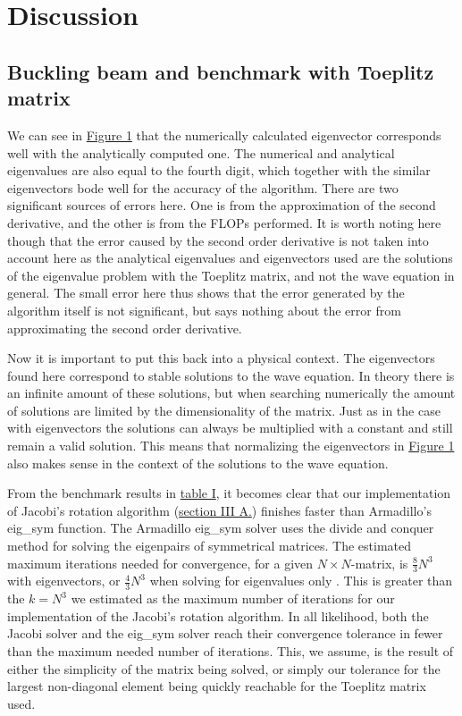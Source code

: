 \documentclass[reprint,english,notitlepage]{revtex4-1}  %
\begin{document}
\newpage

\section{Discussion} \label{sec:V}

\subsection{Buckling beam and benchmark with Toeplitz matrix} \label{sec:V:a}

We can see in \hyperref[fig:IV:a:1]{Figure 1} that the numerically calculated eigenvector corresponds well with the analytically computed one. The numerical and analytical eigenvalues are also equal to the fourth digit, which together with the similar eigenvectors bode well for the accuracy of the algorithm. There are two significant sources of errors here. One is from the approximation of the second derivative, and the other is from the FLOPs performed. It is worth noting here though that the error caused by the second order derivative is not taken into account here as the analytical eigenvalues and eigenvectors used are the solutions of the eigenvalue problem with the Toeplitz matrix, and not the wave equation in general. The small error here thus shows that the error generated by the algorithm itself is not significant, but says nothing about the error from approximating the second order derivative.

Now it is important to put this back into a physical context. The eigenvectors found here correspond to stable solutions to the wave equation. In theory there is an infinite amount of these solutions, but when searching numerically the amount of solutions are limited by the dimensionality of the matrix. Just as in the case with eigenvectors the solutions can always be multiplied with a constant and still remain a valid solution. This means that normalizing the eigenvectors in \hyperref[fig:IV:a:1]{Figure 1} also makes sense in the context of the solutions to the wave equation.

From the benchmark results in \hyperref[table:IV:a:1]{table I}, it becomes clear that our implementation of Jacobi's rotation algorithm (\hyperref[sec:III:a]{section III A.}) finishes faster than Armadillo's eig\_sym function. The Armadillo eig\_sym solver uses the divide and conquer method \citep{Armadillo} for solving the eigenpairs of symmetrical matrices. The estimated maximum iterations needed for convergence, for a given \(N\times N\)-matrix, is \(\frac{8}{3}N^{3}\) with eigenvectors, or \(\frac{4}{3}N^{3}\) when solving for eigenvalues only \citep{Cuppen}. This is greater than the \(k=N^{3}\) we estimated as the maximum number of iterations for our implementation of the Jacobi's rotation algorithm. In all likelihood, both the Jacobi solver and the eig\_sym solver reach their convergence tolerance in fewer than the maximum needed number of iterations. This, we assume, is the result of either the simplicity of the matrix being solved, or simply our tolerance for the largest non-diagonal element being quickly reachable for the Toeplitz matrix used.
\end{document}
